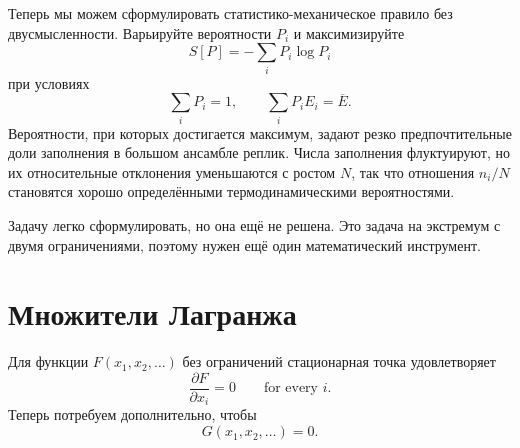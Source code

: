 Теперь мы можем сформулировать статистико-механическое правило без двусмысленности. Варьируйте вероятности \(P_i\) и максимизируйте
\begin{equation}
 S[P]=-\sum_iP_i\log P_i
 \label{eq:sm3-maximize-entropy}
\end{equation}
при условиях
\begin{equation}
 \sum_iP_i=1,
 \qquad
 \sum_iP_iE_i=\overline E.
 \label{eq:sm3-maxent-constraints}
\end{equation}
Вероятности, при которых достигается максимум, задают резко предпочтительные доли заполнения в большом ансамбле реплик. Числа заполнения флуктуируют, но их относительные отклонения уменьшаются с ростом \(N\), так что отношения \(n_i/N\) становятся хорошо определёнными термодинамическими вероятностями.

\begin{classroomqa}
\end{classroomqa}

Задачу легко сформулировать, но она ещё не решена. Это задача на экстремум с двумя ограничениями, поэтому нужен ещё один математический инструмент.

\section{Множители Лагранжа}

Для функции \(F(x_1,x_2,\ldots)\) без ограничений стационарная точка
удовлетворяет
\begin{equation}
 \frac{\partial F}{\partial x_i}=0
 \qquad\text{for every }i.
 \label{eq:sm3-unconstrained-stationary}
\end{equation}
Теперь потребуем дополнительно, чтобы
\begin{equation}
 G(x_1,x_2,\ldots)=0.
 \label{eq:sm3-one-constraint}
\end{equation}

\begin{classroomqa}
\end{classroomqa}

